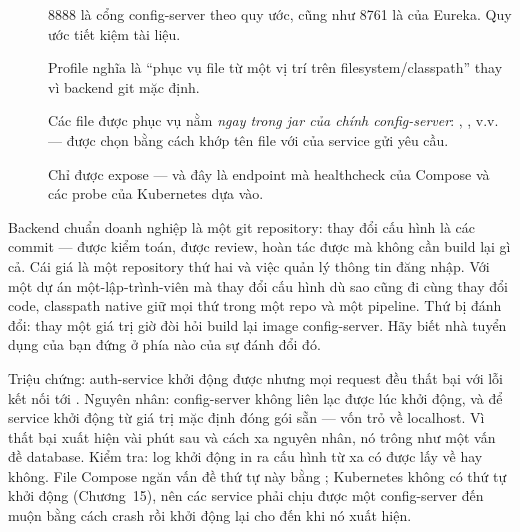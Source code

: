 \begin{description}
  \item[] 8888 là cổng config-server theo quy ước, cũng như 8761 là
  của Eureka. Quy ước tiết kiệm tài liệu.
  \item[] Profile  nghĩa là ``phục vụ file từ một vị
  trí trên filesystem/classpath'' thay vì backend git mặc định.
  \item[] Các file được phục vụ nằm \emph{ngay trong jar của chính
  config-server}: ,
  , v.v. --- được chọn bằng cách khớp tên file với
   của service gửi yêu cầu.
  \item[] Chỉ  được expose --- và đây là endpoint mà
  healthcheck của Compose và các probe của Kubernetes dựa vào.
\end{description}

\begin{decision}
Backend chuẩn doanh nghiệp là một git repository: thay đổi cấu hình là
các commit --- được kiểm toán, được review, hoàn tác được mà không cần
build lại gì cả. Cái giá là một repository thứ hai và việc quản lý thông
tin đăng nhập. Với một dự án một-lập-trình-viên mà thay đổi cấu hình dù
sao cũng đi cùng thay đổi code, classpath native giữ mọi thứ trong một
repo và một pipeline. Thứ bị đánh đổi: thay một giá trị giờ đòi hỏi build
lại image config-server. Hãy biết nhà tuyển dụng của bạn đứng ở phía nào
của sự đánh đổi đó.
\end{decision}

\begin{pitfall}
Triệu chứng: auth-service khởi động được nhưng mọi request đều thất bại
với lỗi kết nối tới . Nguyên nhân: config-server
không liên lạc được lúc khởi động, và  để
service khởi động từ giá trị mặc định đóng gói sẵn --- vốn trỏ về
localhost. Vì thất bại xuất hiện vài phút sau và cách xa nguyên nhân, nó
trông như một vấn đề database. Kiểm tra: log khởi động in ra cấu hình từ
xa có được lấy về hay không. File Compose ngăn vấn đề thứ tự này bằng
; Kubernetes không có thứ
tự khởi động (Chương~15), nên các service phải chịu được một
config-server đến muộn bằng cách crash rồi khởi động lại cho đến khi nó
xuất hiện.
\end{pitfall}

